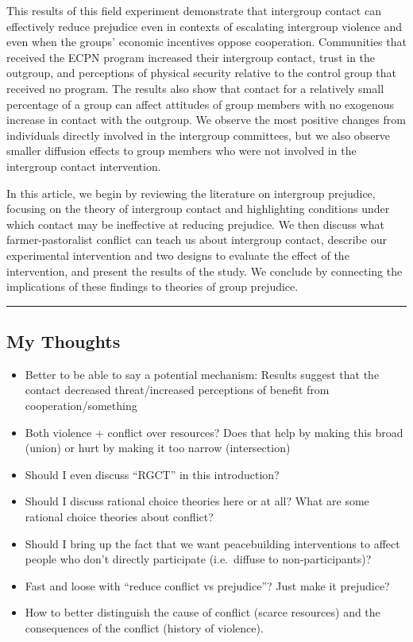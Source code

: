 \documentclass[11pt]{article}
\providecommand{\tightlist}{%
  \setlength{\itemsep}{0pt}\setlength{\parskip}{0pt}}
\begin{document}
This results of this field experiment demonstrate that intergroup
contact can effectively reduce prejudice even in contexts of escalating
intergroup violence and even when the groups' economic incentives oppose
cooperation. Communities that received the ECPN program increased their
intergroup contact, trust in the outgroup, and perceptions of physical
security relative to the control group that received no program. The
results also show that contact for a relatively small percentage of a
group can affect attitudes of group members with no exogenous increase
in contact with the outgroup. We observe the most positive changes from
individuals directly involved in the intergroup committees, but we also
observe smaller diffusion effects to group members who were not involved
in the intergroup contact intervention.

In this article, we begin by reviewing the literature on intergroup
prejudice, focusing on the theory of intergroup contact and highlighting
conditions under which contact may be ineffective at reducing prejudice.
We then discuss what farmer-pastoralist conflict can teach us about
intergroup contact, describe our experimental intervention and two
designs to evaluate the effect of the intervention, and present the
results of the study. We conclude by connecting the implications of
these findings to theories of group prejudice.

\begin{center}\rule{0.5\linewidth}{\linethickness}\end{center}

\subsection{My Thoughts}\label{my-thoughts}

\begin{itemize}
\tightlist
\item
  Better to be able to say a potential mechanism: Results suggest that
  the contact decreased threat/increased perceptions of benefit from
  cooperation/something
\item
  Both violence + conflict over resources? Does that help by making this
  broad (union) or hurt by making it too narrow (intersection)
\item
  Should I even discuss ``RGCT'' in this introduction?
\item
  Should I discuss rational choice theories here or at all? What are
  some rational choice theories about conflict?
\item
  Should I bring up the fact that we want peacebuilding interventions to
  affect people who don't directly participate (i.e.~diffuse to
  non-participants)?
\item
  Fast and loose with ``reduce conflict vs prejudice''? Just make it
  prejudice?
\item
  How to better distinguish the cause of conflict (scarce resources) and
  the consequences of the conflict (history of violence).
\end{itemize}
\end{document}
